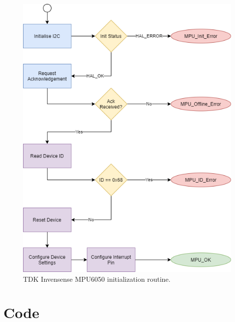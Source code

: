 \begin{figure}[H]
	\centering
	\includegraphics[scale=0.3]{MPU Init Diagram.png}
	\caption{TDK Invensense MPU6050 initialization routine.}
	\label{fig:Init_diagram_mpu}
\end{figure}

\section{Code}

